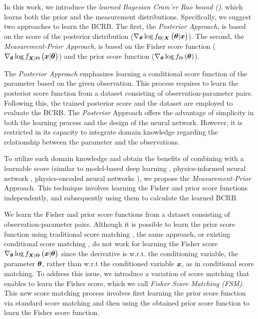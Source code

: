 \documentclass[journal,twoside,web]{ieeecolor}
\begin{document}
In this work, we %
introduce the \emph{learned Bayesian Cram'er Rao bound (\name{})}, which learns both the prior and the measurement distributions. Specifically, we suggest two approaches to learn the BCRB. The first, the \emph{Posterior Approach,} is based on the score of the posterior distribution ($\nabla_{\p}\log\probt{\p|\x}{\pr|\X}$). The second, the \emph{Measurement-Prior Approach,} is based on the Fisher score function ($\nabla_{\p}\log\probt{\x|\p}{\X|\pr}$) and the prior score function ($\nabla_{\bm{\theta}}\log f_{\Theta}\left(\bm{\theta}\right)$). 

The \emph{Posterior Approach} emphasizes learning a conditional score function of the parameter based on the given observation. This process requires 
{to learn} the posterior score function from a dataset consisting of observation-parameter pairs. Following this, the trained posterior score and the dataset are employed to evaluate the BCRB. The \emph{Posterior} Approach offers the advantage of simplicity in both the learning process and the design of the neural network. However, it is restricted in its capacity to integrate domain knowledge regarding the relationship between the parameter and the observations.  

To utilize such domain knowledge and obtain the benefits of combining with a learnable score (similar to model-based deep learning \cite{shlezinger2022model,shlezinger2023model}, physics-informed neural network \cite{banerjee2024physics}, {physics-encoded neural networks \cite{faroughi2024physics,meinders2024application}}), we propose the \emph{Measurement-Prior} Approach. This technique involves  learning the Fisher and prior score functions independently, and subsequently using them to calculate the learned BCRB. 

We {learn} the Fisher and prior score functions from a dataset consisting of observation-parameter pairs. Although it is possible to learn the prior score function using traditional score matching \cite{hyvarinen2005estimation}, the same approach, {or existing conditional score matching \cite{hyvarinen2005estimation,liu2022estimating,yu2019generalized,yu2022generalized}},
do not work for learning the Fisher score $\nabla_{\p}\log\probt{\x|\p}{\X|\pr}$ since the derivative is w.r.t. {the conditioning variable,} the parameter $\bm{\theta}$, {rather than w.r.t the conditioned variable $\bm{x}$, as in conditional  score matching.} To address this issue, we introduce a variation of score matching that enables to learn the Fisher score, which we call \emph{Fisher Score Matching (FSM)}. This {new} score matching process involves first learning the prior score function via standard score matching \cite{hyvarinen2005estimation} and then using the obtained prior score function to learn the Fisher score function. 
\end{document}
